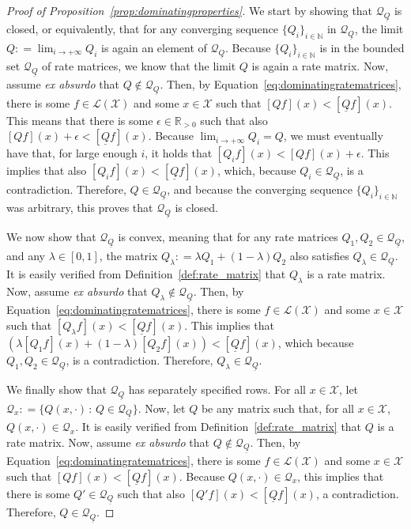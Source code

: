 \documentclass[10pt]{paper}
\theoremstyle{definition}
\newcommand{\nats}{\mathbb{N}}
\newcommand{\reals}{\mathbb{R}}
\newcommand{\realspos}{\reals_{>0}}
\newcommand{\states}{\mathcal{X}}
\newcommand{\gambles}{\mathcal{L}}
\newcommand{\gamblesX}{\gambles(\states)}
\newcommand{\rateset}{\mathcal{Q}}
\newcommand{\lrate}{\underline{Q}}
\newcommand{\coloneqq}{:\!=}
\begin{document}
\begin{proof}[Proof of Proposition~\ref{prop:dominatingproperties}]
We start by showing that $\rateset_{\lrate}$ is closed, or equivalently, that for any converging sequence $\{Q_i\}_{i\in\nats}$ in $\rateset_{\lrate}$, the limit $Q\coloneqq\lim_{i\to+\infty}Q_i$ is again an element of $\rateset_{\lrate}$. Because $\{Q_i\}_{i\in\nats}$ is in the bounded set $\rateset_{\lrate}$ of rate matrices, we know that the limit $Q$ is again a rate matrix. Now, assume \emph{ex absurdo} that $Q\notin\rateset_{\lrate}$. Then, by Equation~\eqref{eq:dominatingratematrices}, there is some $f\in\gamblesX$ and some $x\in\states$ such that $\left[Qf\right](x) < \left[\lrate f\right](x)$. This means that there is some $\epsilon\in\realspos$ such that also $\left[Qf\right](x) + \epsilon < \left[\lrate f\right](x)$. Because $\lim_{i\to+\infty}Q_i=Q$, we must eventually have that, for large enough $i$, it holds that $\left[Q_if\right](x) < \left[Qf\right](x) + \epsilon$. This implies that also $\left[Q_if\right](x) < \left[\lrate f\right](x)$, which, because $Q_i\in\rateset_{\lrate}$, is a contradiction. Therefore, $Q\in\rateset_{\lrate}$, and because the converging sequence $\{Q_i\}_{i\in\nats}$ was arbitrary, this proves that $\rateset_{\lrate}$ is closed.

We now show that $\rateset_{\lrate}$ is convex, meaning that for any rate matrices $Q_1,Q_2\in\rateset_{\lrate}$, and any $\lambda\in[0,1]$, the matrix $Q_\lambda\coloneqq\lambda Q_1 + (1-\lambda)Q_2$ also satisfies $Q_\lambda\in\rateset_{\lrate}$. It is easily verified from Definition~\ref{def:rate_matrix} that $Q_\lambda$ is a rate matrix. Now, assume \emph{ex absurdo} that $Q_\lambda\notin\rateset_{\lrate}$. Then, by Equation~\eqref{eq:dominatingratematrices}, there is some $f\in\gamblesX$ and some $x\in\states$ such that $\left[Q_\lambda f\right](x) < \left[\lrate f\right](x)$. This implies that $\left(\lambda\left[Q_1 f\right](x)+(1-\lambda)\left[Q_2 f\right](x)\right) < \left[\lrate f\right](x)$, which because $Q_1,Q_2\in\rateset_{\lrate}$, is a contradiction. Therefore, $Q_\lambda\in\rateset_{\lrate}$.

We finally show that $\rateset_{\lrate}$ has separately specified rows. For all $x\in\states$, let $\rateset_x\coloneqq\{Q(x,\cdot)\,:\,Q\in\rateset_{\lrate}\}$. Now, let $Q$ be any matrix such that, for all $x\in\states$, $Q(x,\cdot)\in\rateset_x$. It is easily verified from Definition~\ref{def:rate_matrix} that $Q$ is a rate matrix. Now, assume \emph{ex absurdo} that $Q\notin\rateset_{\lrate}$. Then, by Equation~\eqref{eq:dominatingratematrices}, there is some $f\in\gamblesX$ and some $x\in\states$ such that $\left[Qf\right](x) < \left[\lrate f\right](x)$. Because $Q(x,\cdot)\in\rateset_x$, this implies that there is some $Q'\in\rateset_{\lrate}$ such that also $\left[Q'f\right](x) < \left[\lrate f\right](x)$, a contradiction. Therefore, $Q\in\rateset_{\lrate}$.
\end{proof}
\end{document}
